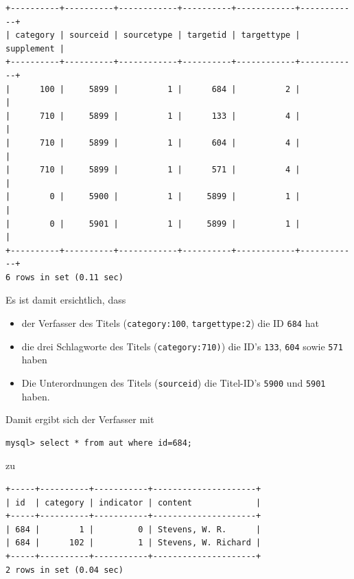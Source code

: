 \documentclass[11pt, twoside, a4paper, BCOR8mm, DIV12, bibtotoc,idxtotoc]{scrbook}
\begin{document}
\begin{shadowenv}
\begin{center}
\begin{verbatim}
+----------+----------+------------+----------+------------+------------+
| category | sourceid | sourcetype | targetid | targettype | supplement |
+----------+----------+------------+----------+------------+------------+
|      100 |     5899 |          1 |      684 |          2 |            |
|      710 |     5899 |          1 |      133 |          4 |            |
|      710 |     5899 |          1 |      604 |          4 |            |
|      710 |     5899 |          1 |      571 |          4 |            |
|        0 |     5900 |          1 |     5899 |          1 |            |
|        0 |     5901 |          1 |     5899 |          1 |            |
+----------+----------+------------+----------+------------+------------+
6 rows in set (0.11 sec)
\end{verbatim}
\end{center}
\end{shadowenv}

Es ist damit ersichtlich, dass 

\begin{itemize}
\item der Verfasser des Titels (\texttt{category:100}, \texttt{targettype:2}) die ID \texttt{684} hat
\item die drei Schlagworte des Titels (\texttt{category:710)}) die ID's
  \texttt{133}, \texttt{604} sowie \texttt{571} haben
\item Die Unterordnungen des Titels (\texttt{sourceid}) die Titel-ID's
  \texttt{5900} und \texttt{5901} haben.
\end{itemize}

Damit ergibt sich der Verfasser mit

\begin{verbatim}
mysql> select * from aut where id=684;
\end{verbatim}

zu 

\begin{shadowenv}
\begin{center}
\begin{verbatim}
+-----+----------+-----------+---------------------+
| id  | category | indicator | content             |
+-----+----------+-----------+---------------------+
| 684 |        1 |         0 | Stevens, W. R.      |
| 684 |      102 |         1 | Stevens, W. Richard |
+-----+----------+-----------+---------------------+
2 rows in set (0.04 sec)
\end{verbatim}
\end{center}
\end{shadowenv}
\end{document}
